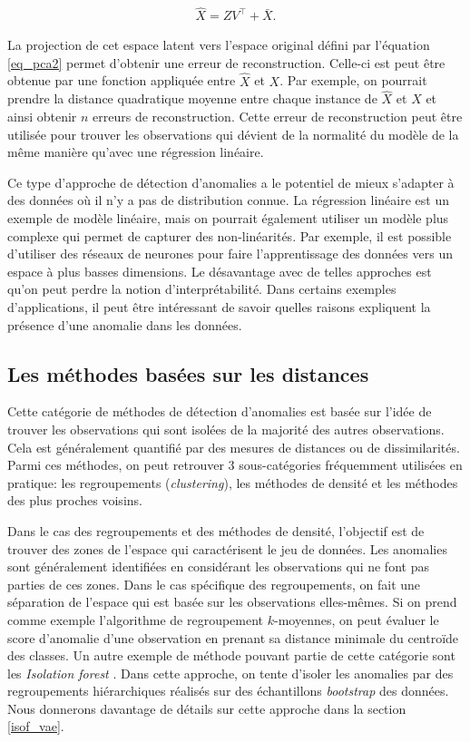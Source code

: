   \begin{gather}  \label{eq_pca2}
 \hat{X} = ZV^\top + \bar{X}.
 \end{gather}
 
La projection de cet espace latent vers l'espace original défini par l'équation \ref{eq_pca2} permet d'obtenir une erreur de reconstruction. Celle-ci est peut être obtenue par une fonction appliquée entre $\hat{X}$ et $X$. Par exemple, on pourrait prendre la distance quadratique moyenne entre chaque instance de $\hat{X}$ et $X$ et ainsi obtenir $n$ erreurs de reconstruction. Cette erreur de reconstruction peut être utilisée pour trouver les observations qui dévient de la normalité du modèle de la même manière qu'avec une régression linéaire.
  
Ce type d'approche de détection d'anomalies a le potentiel de mieux s'adapter à des données où il n'y a pas de distribution connue. La régression linéaire est un exemple de modèle linéaire, mais on pourrait également utiliser un modèle plus complexe qui permet de capturer des non-linéarités. Par exemple, il est possible d'utiliser des réseaux de neurones pour faire l'apprentissage des données vers un espace à plus basses dimensions. Le désavantage avec de telles approches est qu'on peut perdre la notion d'interprétabilité. Dans certains exemples d'applications, il peut être intéressant de savoir quelles raisons expliquent la présence d'une anomalie dans les données.

\subsection{Les méthodes basées sur les distances}

Cette catégorie de méthodes de détection d'anomalies est basée sur l'idée de trouver les observations qui sont isolées de la majorité des autres observations. Cela est généralement quantifié par des mesures de distances ou de dissimilarités. Parmi ces méthodes, on peut retrouver 3 sous-catégories fréquemment utilisées en pratique: les regroupements (\textit{clustering}), les méthodes de densité et les méthodes des plus proches voisins.

Dans le cas des regroupements et des méthodes de densité, l'objectif est de trouver des zones de l'espace qui caractérisent le jeu de données. Les anomalies sont généralement identifiées en considérant les observations qui ne font pas parties de ces zones. Dans le cas spécifique des regroupements, on fait une séparation de l'espace qui est basée sur les observations elles-mêmes. Si on prend comme exemple l'algorithme de regroupement $k$-moyennes, on peut évaluer le score d'anomalie d'une observation en prenant sa distance minimale du centroïde des classes. Un autre exemple de méthode pouvant partie de cette catégorie sont les \textit{Isolation forest} \citep{4781136}. Dans cette approche, on tente d'isoler les anomalies par des regroupements hiérarchiques réalisés sur des échantillons \textit{bootstrap} des données. Nous donnerons davantage de détails sur cette approche dans la section \ref{isof_vae}.

